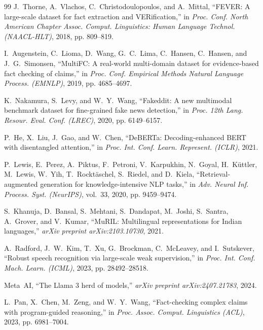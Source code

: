 \documentclass[12pt,a4paper]{report}
\begin{document}
\begin{thebibliography}{99}
J.~Thorne, A.~Vlachos, C.~Christodoulopoulos, and A.~Mittal, ``FEVER: A large-scale dataset for fact extraction and VERification,'' in \emph{Proc. Conf. North American Chapter Assoc. Comput. Linguistics: Human Language Technol. (NAACL-HLT)}, 2018, pp. 809--819.

I.~Augenstein, C.~Lioma, D.~Wang, G.~C.~Lima, C.~Hansen, C.~Hansen, and J.~G.~Simonsen, ``MultiFC: A real-world multi-domain dataset for evidence-based fact checking of claims,'' in \emph{Proc. Conf. Empirical Methods Natural Language Process. (EMNLP)}, 2019, pp. 4685--4697.

K.~Nakamura, S.~Levy, and W.~Y.~Wang, ``Fakeddit: A new multimodal benchmark dataset for fine-grained fake news detection,'' in \emph{Proc. 12th Lang. Resour. Eval. Conf. (LREC)}, 2020, pp. 6149--6157.

P.~He, X.~Liu, J.~Gao, and W.~Chen, ``DeBERTa: Decoding-enhanced BERT with disentangled attention,'' in \emph{Proc. Int. Conf. Learn. Represent. (ICLR)}, 2021.

P.~Lewis, E.~Perez, A.~Piktus, F.~Petroni, V.~Karpukhin, N.~Goyal, H.~K\"{u}ttler, M.~Lewis, W.~Yih, T.~Rockt\"{a}schel, S.~Riedel, and D.~Kiela, ``Retrieval-augmented generation for knowledge-intensive NLP tasks,'' in \emph{Adv. Neural Inf. Process. Syst. (NeurIPS)}, vol.~33, 2020, pp. 9459--9474.

S.~Khanuja, D.~Bansal, S.~Mehtani, S.~Dandapat, M.~Joshi, S.~Santra, A.~Grover, and V.~Kumar, ``MuRIL: Multilingual representations for Indian languages,'' \emph{arXiv preprint arXiv:2103.10730}, 2021.

A.~Radford, J.~W.~Kim, T.~Xu, G.~Brockman, C.~McLeavey, and I.~Sutskever, ``Robust speech recognition via large-scale weak supervision,'' in \emph{Proc. Int. Conf. Mach. Learn. (ICML)}, 2023, pp. 28492--28518.

Meta~AI, ``The Llama 3 herd of models,'' \emph{arXiv preprint arXiv:2407.21783}, 2024.

L.~Pan, X.~Chen, M.~Zeng, and W.~Y.~Wang, ``Fact-checking complex claims with program-guided reasoning,'' in \emph{Proc. Assoc. Comput. Linguistics (ACL)}, 2023, pp. 6981--7004.


\end{thebibliography}
\end{document}
